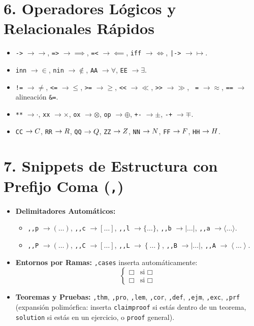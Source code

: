 \documentclass[11pt,book,spanish,alphabetic]{apuntes-scr}
\begin{document}
\section{6. Operadores Lógicos y Relacionales Rápidos}
\begin{itemize}[leftmargin=8mm]
    \item \texttt{->} $\to \to$, \texttt{=>} $\to \implies$, \texttt{=<} $\to \impliedby$, \texttt{iff} $\to \iff$, \texttt{|->} $\to \mapsto$.
    \item \texttt{inn} $\to \in$, \texttt{nin} $\to \notin$, \texttt{AA} $\to \forall$, \texttt{EE} $\to \exists$.
    \item \texttt{!=} $\to \neq$, \texttt{<=} $\to \leq$, \texttt{>=} $\to \geq$, \texttt{<<} $\to \ll$, \texttt{>>} $\to \gg$, \texttt{\string~=} $\to \approx$, \texttt{==} $\to$ alineación \texttt{\&=}.
    \item \texttt{**} $\to \cdot$, \texttt{xx} $\to \times$, \texttt{ox} $\to \otimes$, \texttt{op} $\to \oplus$, \texttt{+-} $\to \pm$, \texttt{-+} $\to \mp$.
    \item \texttt{CC} $\to C$, \texttt{RR} $\to R$, \texttt{QQ} $\to Q$, \texttt{ZZ} $\to Z$, \texttt{NN} $\to N$, \texttt{FF} $\to F$, \texttt{HH} $\to H$.
\end{itemize}

\section{7. Snippets de Estructura con Prefijo Coma (\texttt{,})}
\begin{itemize}[leftmargin=8mm]
    \item \textbf{Delimitadores Automáticos:}
    \begin{itemize}
        \item \texttt{,,p} $\to ( \dots )$, \texttt{,,c} $\to [ \dots ]$, \texttt{,,l} $\to \{ \dots \}$, \texttt{,,b} $\to | \dots |$, \texttt{,,a} $\to \langle \dots \rangle$.
        \item \texttt{,,P} $\to \left( \dots \right)$, \texttt{,,C} $\to \left[ \dots \right]$, \texttt{,,L} $\to \left\{ \dots \right\}$, \texttt{,,B} $\to \left| \dots \right|$, \texttt{,,A} $\to \left\langle \dots \right\rangle$.
    \end{itemize}
    \item \textbf{Entornos por Ramas:} \texttt{,cases} inserta automáticamente:
    \[
        \begin{cases}
            \Box & \text{si } \Box \\
            \Box & \text{si } \Box
        \end{cases}
    \]
    \item \textbf{Teoremas y Pruebas:} \texttt{,thm}, \texttt{,pro}, \texttt{,lem}, \texttt{,cor}, \texttt{,def}, \texttt{,ejm}, \texttt{,exc}, \texttt{,prf} (expansión polimórfica: inserta \texttt{claimproof} si estás dentro de un teorema, \texttt{solution} si estás en un ejercicio, o \texttt{proof} general).
\end{itemize}
\end{document}
